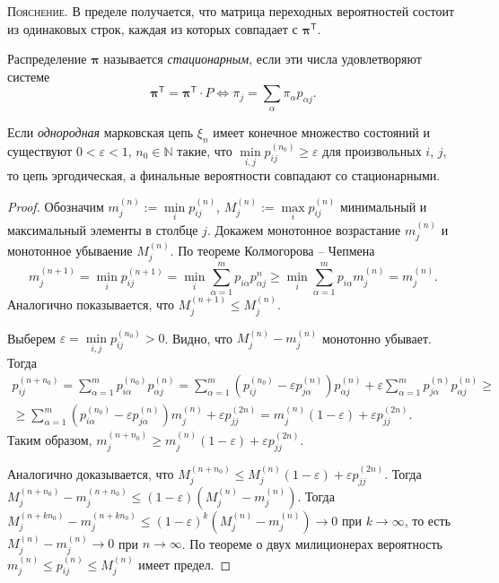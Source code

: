 \textsc{Пояснение}.\hspace{.15em} В пределе получается, что матрица переходных
вероятностей состоит из одинаковых строк, каждая из
которых совпадает с $\bm{\pi}^{\mathsf T}$.

\begin{definition}
  Распределение $\bm{\pi}$ называется \emph{стационарным}, если эти числа удовлетворяют
  системе
  \[
    \bm{\pi}^{\mathsf T} = \bm{\pi}^{\mathsf T} \cdot P
    \Longleftrightarrow 
    \pi_j = \sum_\alpha \pi_\alpha p_{\alpha j}.
  \]
\end{definition}

\begin{theorem}[эргодическая]
  Если \emph{однородная} марковская цепь $\xi_n$ имеет конечное множество состояний и существуют $0
  <\varepsilon < 1$,
  $n_0 \in \mathbb N$ такие, что $\min\limits_{i, j} p_{ij}^{(n_0)} \geqslant
  \varepsilon$ для произвольных $ i $, $ j $, то цепь эргодическая, а
  финальные вероятности совпадают со стационарными.
\end{theorem}
\begin{proof}
  Обозначим $m_j^{(n)} := \min\limits_i p_{ij}^{(n)}$, $M_j^{(n)} := \max\limits_i p_{ij}^{(n)}$ минимальный 
  и максимальный элементы в столбце $ j $. Докажем монотонное возрастание $m_{j}^{(n)}$ и монотонное
  убываение $M_j^{(n)}$. По теореме Колмогорова -- Чепмена
  \[
    m_{j}^{(n+1)} = \min_i p_{ij}^{(n+1)}
    = \min_i \sum_{\alpha=1}^m p_{i\alpha} p_{\alpha j}^{n} \geqslant 
    \min_i \sum_{\alpha=1}^m p_{i \alpha} m_j^{(n)}
    = m_j^{(n)}.
  \]
  Аналогично показывается, что $M_{j}^{(n+1)} \leqslant M_j^{(n)}$.

  Выберем $\varepsilon = \min\limits_{i, j} p_{ij}^{(n_0)} > 0$.
  Видно, что $M_j^{(n)}-m_j^{(n)}$ монотонно убывает. Тогда
  \begin{multline*}
    p_{ij}^{(n+n_0)} = \sum_{\alpha=1}^m p_{i\alpha}^{(n_0)} p_{\alpha j}^{(n)}
    = \sum_{\alpha=1}^m (p_{ij}^{(n_0)} - \varepsilon p_{j \alpha}^{(n)}) p_{\alpha j}^{(n)}
      + \varepsilon \sum_{\alpha=1}^m p_{j \alpha}^{(n)} p_{\alpha j}^{(n)} \geqslant \\
    \geqslant \sum_{\alpha=1}^m (p_{i\alpha}^{(n_0)} - \varepsilon p_{j\alpha}^{(n)}) m_j^{(n)}
      + \varepsilon p_{jj}^{(2n)}
    = m_j^{(n)} (1-\varepsilon) + \varepsilon p_{jj}^{(2n)}.
  \end{multline*}
  Таким образом, $m_j^{(n+n_0)} \geqslant m_j^{(n)} (1-\varepsilon) + \varepsilon p_{jj}^{(2n)}$.
  
  Аналогично доказывается, что $M_j^{(n+n_0)} \leqslant M_j^{(n)}
  (1-\varepsilon) + \varepsilon p_{jj}^{(2n)}$.
  Тогда $M_{j}^{(n+n_0)} - m_j^{(n+n_0)} \leqslant (1-\varepsilon) (M_j^{(n)} - m_j^{(n)})$. 
  Тогда $M_j^{(n+kn_0)} - m_j^{(n+kn_0)} \leqslant (1-\varepsilon)^k (M_j^{(n)}
  - m_j^{(n)}) \to 0$ при $ k\to \infty$, то есть $M_{j}^{(n)} - m_j^{(n)} \to
  0$ при $ n \to \infty$. По теореме о двух милиционерах
  вероятность $m_j^{(n)} \leqslant p_{ij}^{(n)} \leqslant M_j^{(n)}$ имеет
  предел.
\end{proof}

